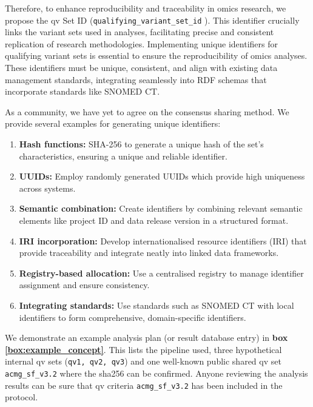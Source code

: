 Therefore, to enhance reproducibility and traceability in omics research, we propose the \ac{qv} Set ID (\texttt{qualifying\_variant\_set\_id} ). This identifier crucially links the variant sets used in analyses, facilitating precise and consistent replication of research methodologies.
Implementing unique identifiers for qualifying variant sets is essential to ensure the reproducibility of omics analyses. These identifiers must be unique, consistent, and align with existing data management standards, integrating seamlessly into RDF schemas that incorporate standards like SNOMED CT.

As a community, we have yet to agree on the consensus sharing method. 
We provide several examples for generating unique identifiers:

\begin{enumerate}
    \item \textbf{Hash functions:} SHA-256 to generate a unique hash of the set's characteristics, ensuring a unique and reliable identifier.
    \item \textbf{UUIDs:} Employ randomly generated UUIDs which provide high uniqueness across systems.
    \item \textbf{Semantic combination:} Create identifiers by combining relevant semantic elements like project ID and data release version in a structured format.
    \item \textbf{IRI incorporation:} Develop internationalised resource identifiers (IRI) that provide traceability and integrate neatly into linked data frameworks.
    \item \textbf{Registry-based allocation:} Use a centralised registry to manage identifier assignment and ensure consistency.
    \item \textbf{Integrating standards:} Use standards such as SNOMED CT with local identifiers to form comprehensive, domain-specific identifiers.
\end{enumerate}

We demonstrate an example analysis plan (or result database entry) in \textbf{box \ref{box:example_concept}}. 
This lists the pipeline used, three hypothetical internal \ac{qv} sets (\texttt{qv1, qv2, qv3}) and one well-known public shared \ac{qv} set \texttt{acmg\_sf\_v3.2}  where the sha256 can be confirmed.
Anyone reviewing the analysis results can be sure that \ac{qv} criteria \texttt{acmg\_sf\_v3.2} has been included in the protocol.

